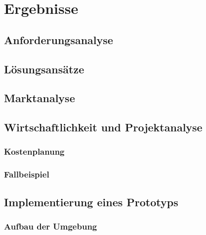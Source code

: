 \documentclass[a4paper, 12pt, oneside]{scrbook}
\begin{document}
\chapter{Ergebnisse}
	
	
	\section{Anforderungsanalyse}
	
	\section{Lösungsansätze}
		
	
	\section{Marktanalyse}
	
	
	\section{Wirtschaftlichkeit und Projektanalyse}
	
		\subsection{Kostenplanung}
		
		\subsection{Fallbeispiel}
	
	\section{Implementierung eines Prototyps}
	
		\subsection{Aufbau der Umgebung}
		
\end{document}
